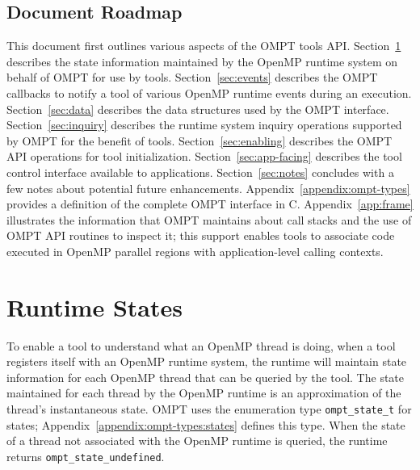 \documentclass{article}
\begin{document}
\subsection{Document Roadmap}
This document first outlines various aspects of the OMPT tools API. 
Section~\ref{sec:states} describes the state information maintained by the OpenMP runtime system on behalf of OMPT for use by tools.
Section~\ref{sec:events} describes the OMPT callbacks to notify a tool of various OpenMP runtime events during an execution.
Section~\ref{sec:data} describes the data structures used by the OMPT interface.
Section~\ref{sec:inquiry} describes the runtime system inquiry operations supported by OMPT for the benefit of tools.
Section~\ref{sec:enabling} describes the OMPT API operations for tool initialization.
Section~\ref{sec:app-facing} describes the tool control interface available to applications.
Section~\ref{sec:notes} concludes with a few notes about potential future enhancements.
Appendix~\ref{appendix:ompt-types} provides a definition of the complete OMPT interface in C.
Appendix~\ref{app:frame} illustrates the information that OMPT maintains about call stacks and the use of OMPT API routines to inspect it; this support enables tools to associate code executed in OpenMP parallel regions with  application-level calling contexts. 

\section{Runtime States} 
\label{sec:states} 

To enable a tool to understand what an OpenMP thread is doing, when a tool registers itself with an OpenMP runtime system, the runtime 
will maintain state information for each OpenMP thread that can be queried by the tool. 
The state maintained for each thread by the OpenMP runtime is an
approximation of the thread's instantaneous state. 
OMPT uses the enumeration type \verb|ompt_state_t| for states;
Appendix~\ref{appendix:ompt-types:states} defines this type.
When the state of a thread not associated with the OpenMP runtime is queried, the runtime returns 
\verb|ompt_state_undefined|.
\end{document}
